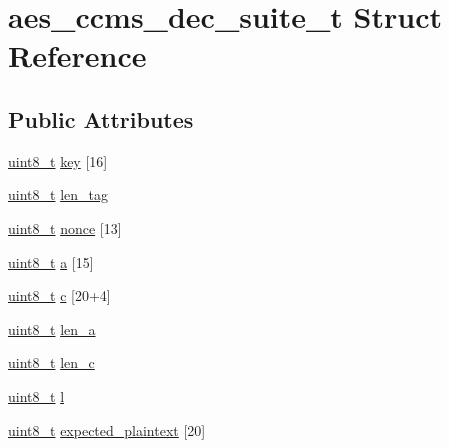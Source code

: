 \hypertarget{structaes__ccms__dec__suite__t}{}\section{aes\+\_\+ccms\+\_\+dec\+\_\+suite\+\_\+t Struct Reference}
\label{structaes__ccms__dec__suite__t}
\subsection*{Public Attributes}
\begin{DoxyCompactItemize}
\item 
\hyperlink{_p_e___types_8h_aba7bc1797add20fe3efdf37ced1182c5}{uint8\+\_\+t} \hyperlink{structaes__ccms__dec__suite__t_a543c86703b6f70924f4711e9c078abf7}{key} \mbox{[}16\mbox{]}
\item 
\hyperlink{_p_e___types_8h_aba7bc1797add20fe3efdf37ced1182c5}{uint8\+\_\+t} \hyperlink{structaes__ccms__dec__suite__t_ab349961aa8e6744a7b23fcd21e44f530}{len\+\_\+tag}
\item 
\hyperlink{_p_e___types_8h_aba7bc1797add20fe3efdf37ced1182c5}{uint8\+\_\+t} \hyperlink{structaes__ccms__dec__suite__t_acb5db52569c939ece78ec9c3ca37f31a}{nonce} \mbox{[}13\mbox{]}
\item 
\hyperlink{_p_e___types_8h_aba7bc1797add20fe3efdf37ced1182c5}{uint8\+\_\+t} \hyperlink{structaes__ccms__dec__suite__t_ab6c4c1e4aaea5736d42808691efbe6d4}{a} \mbox{[}15\mbox{]}
\item 
\hyperlink{_p_e___types_8h_aba7bc1797add20fe3efdf37ced1182c5}{uint8\+\_\+t} \hyperlink{structaes__ccms__dec__suite__t_a954d31fc94cf3c67153c2a7fe0f9f6b9}{c} \mbox{[}20+4\mbox{]}
\item 
\hyperlink{_p_e___types_8h_aba7bc1797add20fe3efdf37ced1182c5}{uint8\+\_\+t} \hyperlink{structaes__ccms__dec__suite__t_a9a4ebf02e9dc1c6180f64cd72d108bd5}{len\+\_\+a}
\item 
\hyperlink{_p_e___types_8h_aba7bc1797add20fe3efdf37ced1182c5}{uint8\+\_\+t} \hyperlink{structaes__ccms__dec__suite__t_ae9c9f7bce8906824dbf4477022534989}{len\+\_\+c}
\item 
\hyperlink{_p_e___types_8h_aba7bc1797add20fe3efdf37ced1182c5}{uint8\+\_\+t} \hyperlink{structaes__ccms__dec__suite__t_a4c1498e0740b07d86716c2428e08fdba}{l}
\item 
\hyperlink{_p_e___types_8h_aba7bc1797add20fe3efdf37ced1182c5}{uint8\+\_\+t} \hyperlink{structaes__ccms__dec__suite__t_aa69d8cfeaaa1d5eb76953650eb4a96ea}{expected\+\_\+plaintext} \mbox{[}20\mbox{]}
\end{DoxyCompactItemize}


